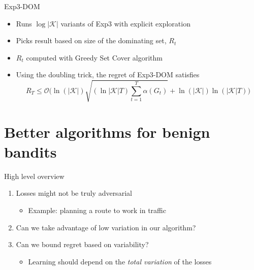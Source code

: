 \documentclass{beamer}
\begin{document}
\begin{frame}{Exp3-DOM}
  \begin{itemize}
    \item Runs $\log |\mathcal{K}|$ variants of Exp3 with explicit exploration
    \item Picks result based on size of the dominating set, $R_t$
    \item $R_t$ computed with Greedy Set Cover algorithm 
    \item Using the doubling trick, the regret of Exp3-DOM satisfies 
      $$R_T\leq \mathcal{O}\Bigg(\ln(|\mathcal{K}|)\sqrt{(\ln |\mathcal{K}|T)\sum_{t=1}^T\alpha(G_t)}+\ln(|\mathcal{K}|)\ln (|\mathcal{K}|T)\Bigg)$$
  \end{itemize}
\end{frame}

\section{Better algorithms for benign bandits}
\begin{frame}{High level overview}

  \begin{enumerate}
  \item
    Losses might not be truly adversarial
    \begin{itemize}   
    \item
      Example: planning a route to work in traffic
    \end{itemize}
    \item
      Can we take advantage of low variation in our algorithm?
    \item
       Can we bound regret based on variability?
      \begin{itemize}
        \item
          Learning should depend on the \textit{total variation} of the losses
        \end{itemize}
  \end{enumerate}
\end{frame}
\end{document}

